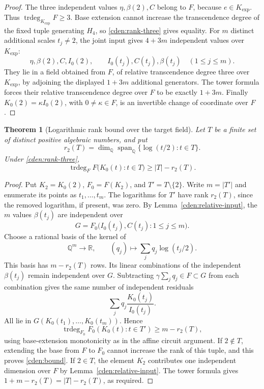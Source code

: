 \documentclass[11pt]{article}
\newtheorem{theorem}{Theorem}[section]
\theoremstyle{definition}
\theoremstyle{remark}
\begin{document}
\begin{proof}
The three independent values $\eta,\beta(2),C$ belong to $F$,
because $e\in K_{\exp}$. Thus
$\operatorname{trdeg}_{K_{\exp}}F\ge3$. Base extension cannot
increase the transcendence degree of the fixed tuple generating
$H_4$, so \eqref{cden:rank-three} gives equality.
For $m$ distinct additional scales $t_j\ne2$, the joint input gives
$4+3m$ independent values over $K_{\exp}$:
\[
 \eta,\beta(2),C,I_0(2),\qquad
 I_0(t_j),C(t_j),\beta(t_j)\quad(1\le j\le m).
\]
They lie in a field obtained from $F$, of relative transcendence
degree three over $K_{\exp}$, by adjoining the displayed $1+3m$
additional generators. The tower formula forces their relative
transcendence degree over $F$ to be exactly $1+3m$.
Finally $K_0(2)=\kappa I_0(2)$, with $0\ne\kappa\in F$, is an
invertible change of coordinate over $F$.
\end{proof}

\begin{theorem}[Logarithmic rank bound over the target field]
\label{cden:rank}
Let $T$ be a finite set of distinct positive algebraic numbers, and put
\[
 r_2(T)=\dim_{\mathbb Q}
       \operatorname{span}_{\mathbb Q}\{\log(t/2):t\in T\}.
\]
Under \eqref{cden:rank-three},
\begin{equation}\label{cden:bound}
 \operatorname{trdeg}_{F}
 F\bigl(K_0(t):t\in T\bigr)\ge |T|-r_2(T).
\end{equation}
\end{theorem}

\begin{proof}
Put $K_2=K_0(2)$, $F_0=F(K_2)$, and
$T'=T\setminus\{2\}$. Write $m=|T'|$ and enumerate its points as
$t_1,\ldots,t_m$. The logarithms for $T'$ have rank $r_2(T)$,
since the removed logarithm, if present, was zero.
By Lemma~\ref{cden:relative-input}, the $m$ values $\beta(t_j)$
are independent over
\[
 G=F_0\bigl(I_0(t_j),C(t_j):1\le j\le m\bigr).
\]
Choose a rational basis of the kernel of
\[
 \mathbb Q^m\longrightarrow\mathbb R,
 \qquad(q_j)\longmapsto\sum_jq_j\log(t_j/2).
\]
This basis has $m-r_2(T)$ rows. Its linear combinations of the
independent $\beta(t_j)$ remain independent over $G$. Subtracting
$\gamma\sum_jq_j\in F\subset G$ from each combination gives the
same number of independent residuals
\[
                 \sum_jq_j\frac{K_0(t_j)}{I_0(t_j)}.
\]
All lie in $G(K_0(t_1),\ldots,K_0(t_m))$. Hence
\[
 \operatorname{trdeg}_{F_0}
 F_0(K_0(t):t\in T')\ge m-r_2(T),
\]
using base-extension monotonicity as in the affine circuit argument.
If $2\notin T$, extending the base from $F$ to $F_0$ cannot
increase the rank of this tuple, and this proves
\eqref{cden:bound}. If $2\in T$, the element $K_2$ contributes one
independent dimension over $F$ by
Lemma~\ref{cden:relative-input}. The tower formula gives
$1+m-r_2(T)=|T|-r_2(T)$, as required.
\end{proof}
\end{document}
